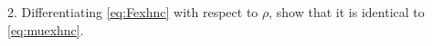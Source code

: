\documentclass{book}
\begin{document}
2. Differentiating \eqref{eq:Fexhnc} with respect to $\rho$,
show that it is identical to \eqref{eq:muexhnc}.


%
%
%





\end{document}
